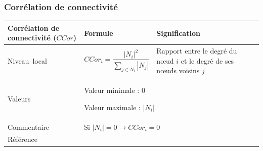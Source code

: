 \documentclass{article}
\begin{document}
\subsubsection{Corrélation de connectivité}
\label{metric_CCor}
\begin{table}[H]
\raggedright
\begin{tabular}{|m{3.24cm}|m{4.4810004cm}m{7.924cm}|}

\hline
Corrélation de connectivité ($CCor$) &
\multicolumn{1}{m{4.4810004cm}|}{Formule} &
Signification\\\hline
Niveau~local 

 &
\multicolumn{1}{m{4.4810004cm}|}{\begin{equation*}
{\mathit{CCor}}_{i}=\frac{{\left|{N}_{i}\right|}^{2}}{\sum _{j{\in}{N}_{i}}{\left|{N}_{j}\right|}}
\end{equation*}
} &
Rapport entre le degré du nœud $i$ et le degré de ses nœuds voisins $j$\\\hline
Valeurs &
\multicolumn{2}{m{12.6050005cm}|}{Valeur minimale : 0

Valeur maximale :  $\left|{N}_{i}\right|$}\\\hline
Commentaire &
\multicolumn{2}{m{12.6050005cm}|}{Si  $\left|{N}_{i}\right|=0\rightarrow {\mathit{CCor}}_{i}=0$}\\\hline
Référence &
\multicolumn{2}{m{12.6050005cm}|}{\cite{Minor2008}}\\\hline
\end{tabular}
\end{table}

\pagebreak



\end{document}
